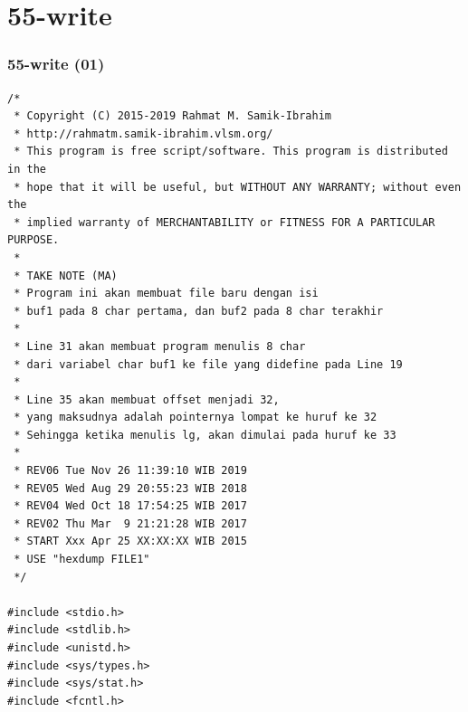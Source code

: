 \documentclass[xcolor=table, notheorems, hyperref={pdfpagelabels=false}]{beamer}
\begin{document}
\section{55-write}
\begin{frame}[fragile]
\frametitle{55-write (01)}
\begin{lstlisting}[basicstyle=\ttfamily\tiny]
/*
 * Copyright (C) 2015-2019 Rahmat M. Samik-Ibrahim
 * http://rahmatm.samik-ibrahim.vlsm.org/
 * This program is free script/software. This program is distributed in the 
 * hope that it will be useful, but WITHOUT ANY WARRANTY; without even the 
 * implied warranty of MERCHANTABILITY or FITNESS FOR A PARTICULAR PURPOSE.
 *
 * TAKE NOTE (MA)
 * Program ini akan membuat file baru dengan isi
 * buf1 pada 8 char pertama, dan buf2 pada 8 char terakhir
 *
 * Line 31 akan membuat program menulis 8 char 
 * dari variabel char buf1 ke file yang didefine pada Line 19
 *
 * Line 35 akan membuat offset menjadi 32,
 * yang maksudnya adalah pointernya lompat ke huruf ke 32
 * Sehingga ketika menulis lg, akan dimulai pada huruf ke 33
 *
 * REV06 Tue Nov 26 11:39:10 WIB 2019
 * REV05 Wed Aug 29 20:55:23 WIB 2018
 * REV04 Wed Oct 18 17:54:25 WIB 2017
 * REV02 Thu Mar  9 21:21:28 WIB 2017
 * START Xxx Apr 25 XX:XX:XX WIB 2015
 * USE "hexdump FILE1"
 */

#include <stdio.h>
#include <stdlib.h>
#include <unistd.h>
#include <sys/types.h>
#include <sys/stat.h>
#include <fcntl.h>

\end{lstlisting}
\end{frame}
\end{document}
